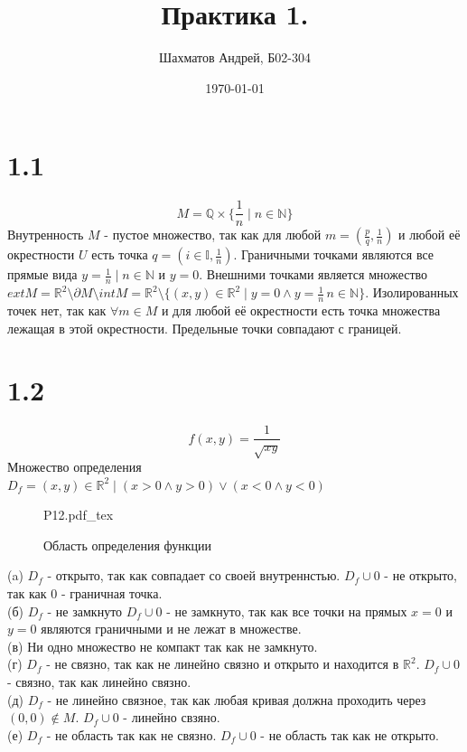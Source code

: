 \documentclass[12pt]{article}
\title{Практика 1.}
\author{Шахматов Андрей, Б02-304}
\date{\today}
\newcommand{\incfig}[1]{
    {#1.pdf_tex}
}
\begin{document}
\maketitle
\tableofcontents

\section{1.1}
$$M = \mathbb{Q} \times \{\frac{1}{n} \mid n \in \mathbb{N}\}$$
Внутренность $M$ - пустое множество, так как для любой $m = \left(\frac{p}{q}, \frac{1}{n}\right)$ 
и любой её окрестности $U$ есть точка $q = \left(i \in \mathbb{I}, \frac{1}{n}\right)$.
Граничными точками являются все прямые вида $y = \frac{1}{n} \mid n \in \mathbb{N}$ и $y = 0$.
Внешними точками является множество $ext M = \mathbb{R}^2 \setminus \partial M \setminus int M = \mathbb{R}^2 \setminus \{(x, y) \in \mathbb{R}^2 \mid y = 0 \land y = \frac{1}{n} \, n \in \mathbb{N}\}$.
Изолированных точек нет, так как $\forall m \in M$ и для любой её окрестности есть точка множества лежащая в этой окрестности.
Предельные точки совпадают с границей. 

\section{1.2}
$$f(x, y) = \frac{1}{\sqrt{xy}}$$
Множество определения $D_f = {(x, y) \in \mathbb{R}^2 \mid (x > 0 \land y > 0) \lor (x < 0 \land y < 0)}$
\begin{figure}[H]
    \centering
    \def\svgwidth{0.5\columnwidth}
    \incfig{P12}
    \caption{Область определения функции}
    \label{fig:P12}
\end{figure}
(a) $D_f$ - открыто, так как совпадает со своей внутреннстью. 
$D_f \cup {0}$ - не открыто, так как 0 - граничная точка. \\
(б) $D_f$ - не замкнуто
$D_f \cup {0}$ - не замкнуто, так как все точки на прямых $x =
0$ и $y = 0$ являются граничными и не лежат в множестве. \\
(в) Ни одно множество не компакт так как не замкнуто. \\
(г) $D_f$ - не связно, так как не линейно связно и открыто и находится в $\mathbb{R}^2$.
$D_f \cup {0}$ - связно, так как линейно связно. \\
(д) $D_f$ - не линейно связное, так как любая кривая должна проходить через $(0, 0) \not \in M$.
$D_f \cup {0}$ - линейно свзяно. \\
(е) $D_f$ - не область так как не связно.
$D_f \cup {0}$ - не область так как не открыто. \\
\end{document}
